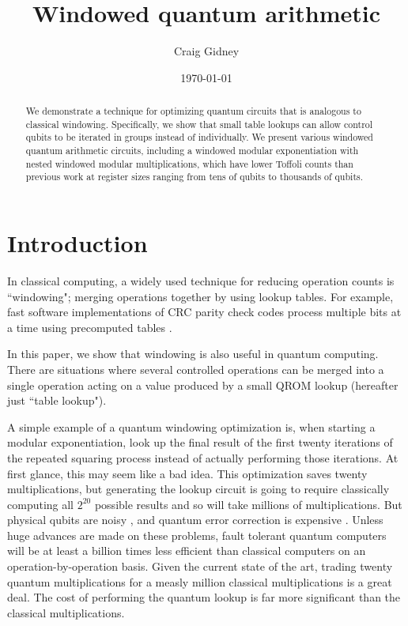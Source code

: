 \documentclass[onecolumn,unpublished]{quantumarticle}
\theoremstyle{definition}
\theoremstyle{definition}
\theoremstyle{definition}
\begin{document}
\title{Windowed quantum arithmetic}

\date{\today}
\author{Craig Gidney}

\begin{abstract}
We demonstrate a technique for optimizing quantum circuits that is analogous to classical windowing.
Specifically, we show that small table lookups can allow control qubits to be iterated in groups instead of individually.
We present various windowed quantum arithmetic circuits, including a windowed modular exponentiation with nested windowed modular multiplications, which have lower Toffoli counts than previous work at register sizes ranging from tens of qubits to thousands of qubits.
\end{abstract}

\maketitle




\section{Introduction}
\label{sec:introduction}

In classical computing, a widely used technique for reducing operation counts is ``windowing"; merging operations together by using lookup tables.
For example, fast software implementations of CRC parity check codes process multiple bits at a time using precomputed tables \cite{perez1983crcbyte}.

In this paper, we show that windowing is also useful in quantum computing.
There are situations where several controlled operations can be merged into a single operation acting on a value produced by a small QROM lookup \cite{babbush2018} (hereafter just ``table lookup").

A simple example of a quantum windowing optimization is, when starting a modular exponentiation, look up the final result of the first twenty iterations of the repeated squaring process instead of actually performing those iterations.
At first glance, this may seem like a bad idea.
This optimization saves twenty multiplications, but generating the lookup circuit is going to require classically computing all $2^{20}$ possible results and so will take millions of multiplications.
But physical qubits are noisy \cite{schroeder2009dram,Bare13,Kim2014}, and quantum error correction is expensive \cite{fowler2012surfacecodereview, campbell2018constraintsatisfaction}.
Unless huge advances are made on these problems, fault tolerant quantum computers will be at least a billion times less efficient than classical computers on an operation-by-operation basis.
Given the current state of the art, trading twenty quantum multiplications for a measly million classical multiplications is a great deal.
The cost of performing the quantum lookup is far more significant than the classical multiplications.
\end{document}
